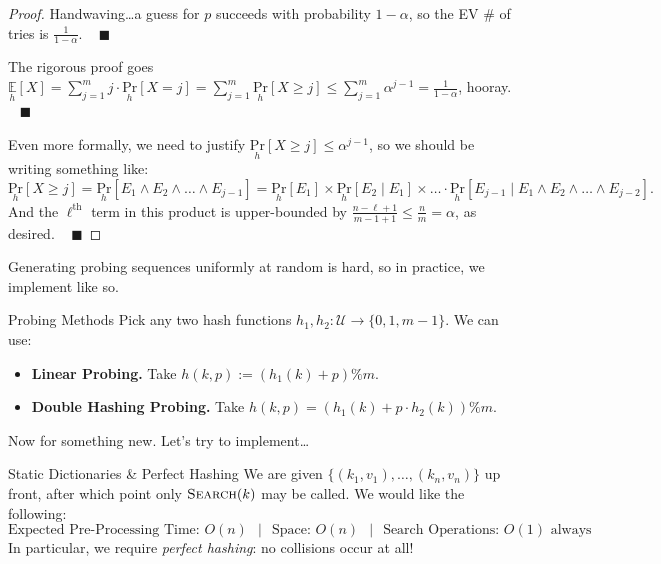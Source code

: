 \begin{proof}
    Handwaving\dots a guess for $p$ succeeds with probability $1 - \alpha$, so the EV \# of tries is $\frac{1}{1 - \alpha}$. ~ $\blacksquare$

    The rigorous proof goes $\underset{h}{\mathbb{E}}[X] = \displaystyle\sum_{j = 1}^m j \cdot \underset{h}{\mathrm{Pr}}[X = j] = \displaystyle \sum_{j = 1}^m \underset{h}{\mathrm{Pr}}[X \geq j] \leq \displaystyle\sum_{j = 1}^m \alpha^{j - 1} = \frac{1}{1 - \alpha}$, hooray. ~ $\blacksquare$

    Even more formally, we need to justify $\underset{h}{\mathrm{Pr}}[X \geq j] \leq \alpha^{j - 1}$, so we should be writing something like:
    \[ \underset{h}{\mathrm{Pr}}[X \geq j] = \underset{h}{\mathrm{Pr}}[E_1 \wedge E_2 \wedge \dots \wedge E_{j - 1}] = \underset{h}{\mathrm{Pr}}[E_1] \times \underset{h}{\mathrm{Pr}}[E_2 \mid E_1] \times \dots \cdot \underset{h}{\mathrm{Pr}}[E_{j - 1} \mid E_1 \wedge E_2 \wedge \dots \wedge E_{j - 2}]. \]
    And the $\ell^{\text{th}}$ term in this product is upper-bounded by $\frac{n - \ell + 1}{m - 1 + 1} \leq \frac{n}{m} = \alpha$, as desired. ~ $\blacksquare$
\end{proof}

Generating probing sequences uniformly at random is hard, so in practice, we implement like so.

\begin{solution}{Probing Methods}
    Pick any two hash functions $h_1, h_2: \mathcal{U} \to \{0, 1, m - 1\}$.  We can use:
    \begin{itemize}
        \item \textbf{Linear Probing.} Take $h(k, p) := (h_1(k) + p) \%m$.
        \item \textbf{Double Hashing Probing.} Take $h(k, p) = (h_1(k) + p \cdot h_2(k)) \%m$.
    \end{itemize}
\end{solution}


Now for something new.  Let's try to implement\dots

\begin{problem}{Static Dictionaries \& Perfect Hashing}
    We are given $\{(k_1, v_1), \dots, (k_n, v_n)\}$ up front, after which point only $\textsc{Search}(k)$ may be called.  We would like the following:
    \[ \text{Expected Pre-Processing Time: } O(n) ~~ \mid ~~ \text{Space: } O(n) ~~ \mid ~~ \text{Search Operations: } O(1) \text{ always} \]
    In particular, we require \emph{perfect hashing}: no collisions occur at all!
\end{problem}


